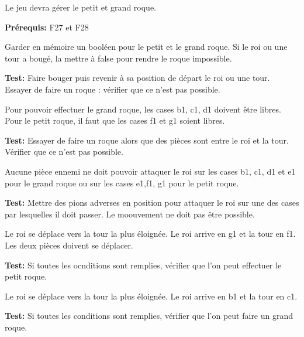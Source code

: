 \documentclass{article}
\begin{document}
\begin{needbox}
    Le jeu devra gérer le petit et grand roque.

    \textbf{Prérequis:} F27 et F28
    \begin{subneedbox}
        Garder en mémoire un booléen pour le petit et le grand roque.
        Si le roi ou une tour a bougé, la mettre à false pour rendre le roque impossible.

        \textbf{Test:} Faire bouger puis revenir à sa position de départ
         le roi ou une tour. Essayer de faire un roque : vérifier que ce n'est pas possible.
    \end{subneedbox}
    \begin{subneedbox}
        Pour pouvoir effectuer le grand roque, les cases b1, c1, d1 doivent être libres.
        Pour le petit roque, il faut que les cases f1 et g1 soient libres.

        \textbf{Test:} Essayer de faire un roque alors que des pièces sont entre
        le roi et la tour. Vérifier que ce n'est pas possible.
    \end{subneedbox}
    \begin{subneedbox}
        Aucune pièce ennemi ne doit pouvoir attaquer le roi sur les cases b1, c1, d1 
        et e1 pour le grand roque ou sur les cases e1,f1, g1 pour le petit roque.

        \textbf{Test:} Mettre des pions adverses en position pour attaquer le roi sur une des cases
        par lesquelles il doit passer. Le moouvement ne doit pas être possible.
    \end{subneedbox}
    \begin{subneedbox}
        Le roi se déplace vers la tour la plus éloignée. Le roi arrive en g1 et 
        la tour en f1. Les deux pièces doivent se déplacer.

        \textbf{Test:} Si toutes les ocnditions sont remplies, vérifier que l'on
         peut effectuer le petit roque.
    \end{subneedbox}
    \begin{subneedbox}
        Le roi se déplace vers la tour la plus éloignée. Le roi arrive en b1 et la tour en c1.

        \textbf{Test:} Si toutes les conditions sont remplies, vérifier que l'on peut faire
        un grand roque.
    \end{subneedbox}
\end{needbox}
\end{document}
